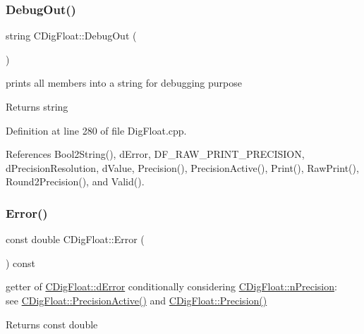 \subsubsection{\texorpdfstring{Debug\+Out()}{DebugOut()}}
{\footnotesize\ttfamily string C\+Dig\+Float\+::\+Debug\+Out (\begin{DoxyParamCaption}{ }\end{DoxyParamCaption})}



prints all members into a string for debugging purpose 

\begin{DoxyReturn}{Returns}
string 
\end{DoxyReturn}


Definition at line 280 of file Dig\+Float.\+cpp.



References Bool2\+String(), d\+Error, D\+F\+\_\+\+R\+A\+W\+\_\+\+P\+R\+I\+N\+T\+\_\+\+P\+R\+E\+C\+I\+S\+I\+ON, d\+Precision\+Resolution, d\+Value, Precision(), Precision\+Active(), Print(), Raw\+Print(), Round2\+Precision(), and Valid().

\mbox{\label{classCDigFloat_a1b067b1bde507408956fa65bef7368bb}} 
\subsubsection{\texorpdfstring{Error()}{Error()}\hspace{0.1cm}{\footnotesize\ttfamily [1/2]}}
{\footnotesize\ttfamily const double C\+Dig\+Float\+::\+Error (\begin{DoxyParamCaption}{ }\end{DoxyParamCaption}) const\hspace{0.3cm}{\ttfamily [inline]}}



getter of \hyperlink{classCDigFloat_a25eb3782d1e727ff007a48f8308e3d4d}{C\+Dig\+Float\+::d\+Error} conditionally considering \hyperlink{classCDigFloat_ad580654be35246d14c91482581c0bc11}{C\+Dig\+Float\+::n\+Precision}\+: ~\newline
 see \hyperlink{classCDigFloat_a4d6ca24beda280be719374c2a6b2c64d}{C\+Dig\+Float\+::\+Precision\+Active()} and \hyperlink{classCDigFloat_a95875f6f7246debee0d00b0c41c82aee}{C\+Dig\+Float\+::\+Precision()} 

\begin{DoxyReturn}{Returns}
const double 
\end{DoxyReturn}


